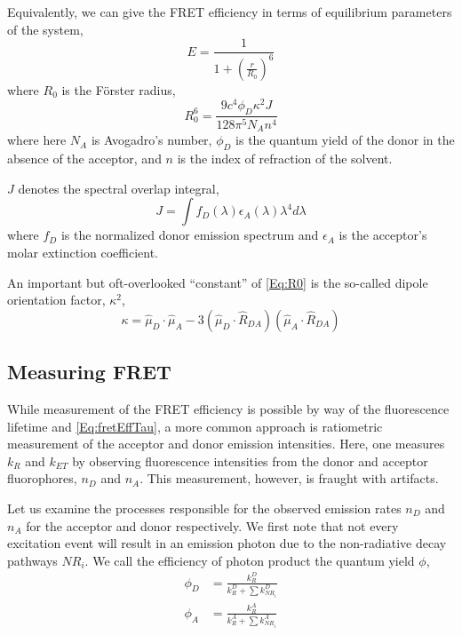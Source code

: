 \documentclass{article}
\newcommand{\NR}{\ensuremath{\mathit{NR}}}          %
\newcommand{\ET}{\ensuremath{\mathit{ET}}}          %
\begin{document}
Equivalently, we can give the FRET efficiency in terms of equilibrium
parameters of the system,
\begin{equation}
  E = \frac{1}{1 + \left( \frac{r}{R_0} \right)^6}
  \label{Eq:fretEff}
\end{equation}
where $R_0$ is the F\"orster radius,
\begin{equation}
  R_0^6 = \frac{9 c^4 \phi_D \kappa^2 J}{128 \pi^5 N_A n^4}
  \label{Eq:R0}
\end{equation}
where here $N_A$ is Avogadro's number, $\phi_D$ is the quantum yield of the
donor in the absence of the acceptor, and $n$ is the index of
refraction of the solvent.

$J$ denotes the spectral overlap integral,
\[ J = \int f_D(\lambda) \epsilon_A(\lambda) \lambda^4 d\lambda \]
where $f_D$ is the normalized donor emission spectrum and $\epsilon_A$
is the acceptor's molar extinction coefficient.

An important but oft-overlooked ``constant'' of \eqref{Eq:R0} is
the so-called dipole orientation factor, $\kappa^2$,
\begin{equation}
  \kappa = \hat\mu_D \cdot \hat\mu_A - 3(\hat\mu_D \cdot \hat R_{DA}) (\hat\mu_A \cdot \hat R_{DA})
  \label{Eq:kappa}
\end{equation}

\subsection{Measuring FRET}
While measurement of the FRET efficiency is possible by way of the
fluorescence lifetime and \eqref{Eq:fretEffTau}, a more common
approach is ratiometric measurement of the acceptor and donor emission
intensities\cite{Dahan1999}. Here, one measures $k_R$ and $k_\ET$ by observing
fluorescence intensities from the donor and acceptor fluorophores,
$n_D$ and $n_A$. This measurement, however, is fraught with
artifacts.

Let us examine the processes responsible for the observed emission rates
$n_D$ and $n_A$ for the acceptor and donor respectively. We first note
that not every excitation event will result in an emission photon due
to the non-radiative decay pathways $\NR_i$. We call the efficiency of
photon product the quantum yield $\phi$,
\begin{align*}
  \phi_D & = \frac{k^D_R}{k^D_R + \sum k^D_{\NR_i}} \\
  \phi_A & = \frac{k^A_R}{k^A_R + \sum k^A_{\NR_i}} \\
\end{align*}
\end{document}
